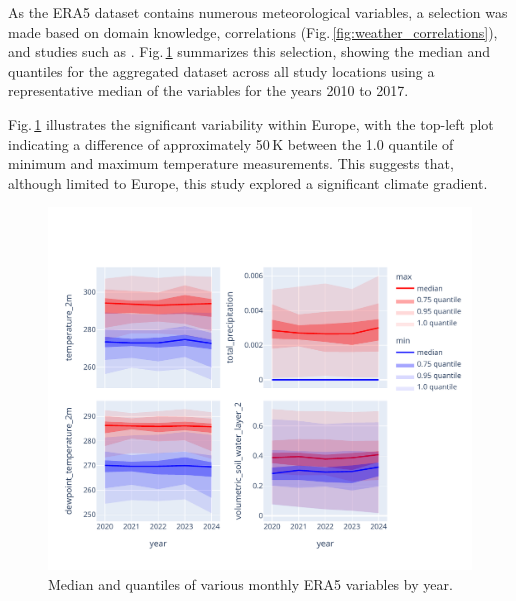 As the ERA5 dataset contains numerous meteorological variables, a selection was made based on domain knowledge, correlations (Fig.\,\ref{fig:weather_correlations}), and studies such as \cite{climate_choice}. Fig.\,\ref{fig:selected_variables_stats} summarizes this selection, showing the median and quantiles for the aggregated dataset across all study locations using a representative median of the variables for the years 2010 to 2017. 

Fig.\,\ref{fig:selected_variables_stats} illustrates the significant variability within Europe, with the top-left plot indicating a difference of approximately 50\,K between the 1.0 quantile of minimum and maximum temperature measurements. This suggests that, although limited to Europe, this study explored a significant climate gradient. 

\begin{figure}[ht]
    \centering
    \includegraphics[width=0.98\linewidth, trim={20pt 20pt 10pt 40pt}, clip]{figures/figures_climate/selected_variables_stats.pdf}
    \caption{Median and quantiles of various monthly ERA5 variables by year.}
    \label{fig:selected_variables_stats}
\end{figure}
